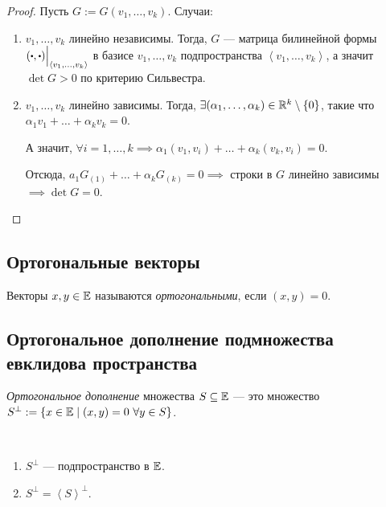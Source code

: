 \begin{proof}
    Пусть $G := G(v_1, \dots, v_k)$.
    Случаи:
    \begin{enumerate}
    \item $v_1, \dots, v_k$ линейно независимы. Тогда, $G$ --- матрица билинейной формы $(\bigcdot, \bigcdot) \Big|_{\left< v_1, \dots, v_k \right>}$ в базисе $v_1, \dots, v_k$ подпространства $\left< v_1, \dots, v_k \right>$, а значит $\det G > 0$ по критерию Сильвестра.
    
    \item $v_1, \dots, v_k$ линейно зависимы. Тогда, $\exists (\alpha_1, \dots, \alpha_k) \in \mathbb{R}^k \setminus \{0\}$, такие что $\alpha_1 v_1 + \dots + \alpha_k v_k = 0$.

        А значит,  $\forall i = 1, \dots, k \implies \alpha_1 (v_1, v_i) + \dots + \alpha_k (v_k, v_i) = 0$.
        
        Отсюда, $a_1 G_{(1)} + \dots + \alpha_k G_{(k)} = 0 \implies$ строки в $G$ линейно зависимы $\implies \det G = 0$.
        \qedhere
    \end{enumerate}
\end{proof}


\subsection{Ортогональные векторы}

\begin{definition}
    Векторы $x, y \in \mathbb{E}$ называются \textit{ортогональными}, если $(x, y) = 0$.
\end{definition}


\subsection{Ортогональное дополнение подмножества евклидова пространства}

\begin{definition}
    \textit{Ортогональное дополнение} множества $S \subseteq \mathbb{E}$ --- это множество $S^{\perp} := \{x \in \mathbb{E} \mid (x, y) = 0 \ \forall y \in S\}$.
\end{definition}

\begin{exercise}~
    \begin{enumerate}
    \item $S^{\perp}$ --- подпространство в $\mathbb{E}$.
    \item $S^{\perp} = \left< S \right>^{\perp}$.
    \end{enumerate}
\end{exercise}

